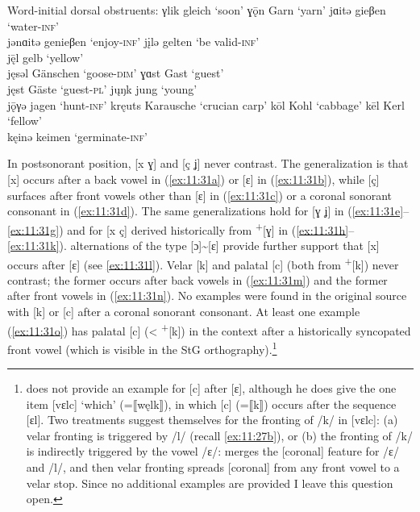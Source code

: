 \ea%
\label{ex:11:30}Word-initial dorsal obstruents:
\ea\label{ex:11:30a} γlik \tab [ɣlik] \tab gleich \tab ‘soon’ 
\ex\label{ex:11:30b} ɣǭn \tab [ɣɔːn] \tab Garn \tab ‘yarn’ 
\ex\label{ex:11:30c} jɑitə \tab [ʝɑitə] \tab  gieβen \tab ‘water-\textsc{inf}’ \\
    jənɑitə \tab [ʝənɑitə] \tab genieβen \tab ‘enjoy-\textsc{inf}’ 
\ex\label{ex:11:30d} j\k{i}lə \tab [ʝɪlə] \tab gelten \tab ‘be valid-\textsc{inf}’ \\
    j\={ę}l \tab [ʝɛːl] \tab gelb \tab ‘yellow’ \\
    jęsəl \tab [ʝɛsəl] \tab Gänschen \tab ‘goose-\textsc{dim}’ 
\ex\label{ex:11:30e} ɣɑst \tab [ɣɑst] \tab  Gast \tab ‘guest’ \\
    jęst \tab [ʝɛst] \tab Gäste \tab ‘guest-\textsc{pl}’ 
\ex\label{ex:11:30f} jųŋk \tab  [ʝʊŋk] \tab jung \tab ‘young’ \\
    jǭγə \tab [ʝɔːɣə] \tab jagen \tab ‘hunt-\textsc{inf}’ 
\ex\label{ex:11:30g} kręuts \tab [krɛuts] \tab Karausche \tab ‘crucian carp’ 
\ex\label{ex:11:30h} kōl \tab [koːl] \tab Kohl \tab ‘cabbage’ 
\ex\label{ex:11:30i} kēl \tab [ceːl] \tab Kerl \tab ‘fellow’ \\
    kęinə \tab [cɛinə] \tab keimen \tab ‘germinate-\textsc{inf}’ 
\z 
\z 

In postsonorant position, [x ɣ] and [ç ʝ] never contrast. The generalization is that [x] occurs after a back vowel in (\ref{ex:11:31a}) or [ɛ] in (\ref{ex:11:31b}), while [ç] surfaces after front vowels other than [ɛ] in (\ref{ex:11:31c}) or a coronal sonorant consonant in (\ref{ex:11:31d}). The same generalizations hold for [ɣ ʝ] in (\ref{ex:11:31e}--\ref{ex:11:31g}) and for [x ç] derived historically from  \textsuperscript{+}[ɣ] in (\ref{ex:11:31h}--\ref{ex:11:31k}).  alternations of the type [ɔ]{\textasciitilde}[ɛ] provide further support that [x] occurs after [ɛ] (see \ref{ex:11:31l}). Velar [k] and palatal [c] (both from  \textsuperscript{+}[k]) never contrast; the former occurs after back vowels in (\ref{ex:11:31m}) and the former after front vowels in (\ref{ex:11:31n}). No examples were found in the original source with [k] or [c] after a coronal sonorant consonant. At least one example (\ref{ex:11:31o}) has palatal [c] (<  \textsuperscript{+}[k]) in the context after a historically syncopated front vowel (which is visible in the StG orthography).\footnote{\citet{Tita1921} does not provide an example for [c] after [ɛ], although he does give the one item [vɛlc] ‘which’ (=⟦węlk⟧), in which [c] (=⟦k⟧) occurs after the sequence [ɛl]. Two treatments suggest themselves for the fronting of /k/ in [vɛlc]: (a) velar fronting is triggered by /l/ (recall \ref{ex:11:27b}), or (b) the fronting of /k/ is indirectly triggered by the vowel /ɛ/:  merges the [coronal] feature for /ɛ/ and /l/, and then velar fronting spreads [coronal] from any front vowel to a velar stop. Since no additional examples are provided I leave this question open.}

